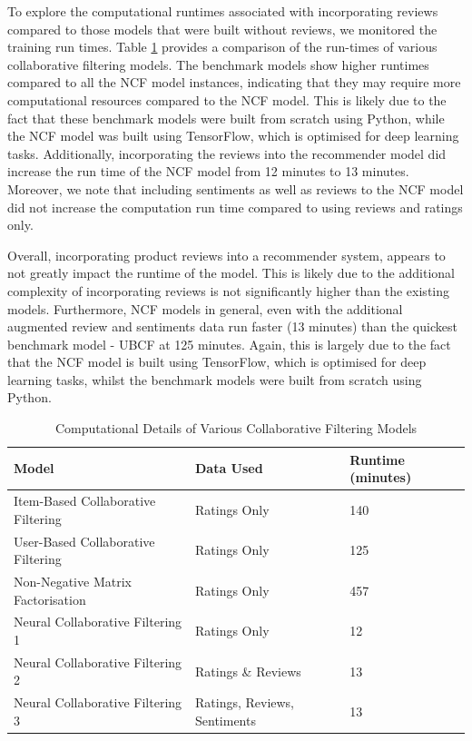 To explore the computational runtimes associated with incorporating reviews compared to those models that were built without reviews, we monitored the training run times. Table \ref{tab:computational-details} provides a comparison of the run-times of various collaborative filtering models. The benchmark models show higher runtimes compared to all the NCF model instances, indicating that they may require more computational resources compared to the NCF model. This is likely due to the fact that these benchmark models were built from scratch using Python, while the NCF model was built using TensorFlow, which is optimised for deep learning tasks. Additionally, incorporating the reviews into the recommender model did increase the run time of the NCF model from 12 minutes to 13 minutes. Moreover, we note that including sentiments as well as reviews to the NCF model did not increase the computation run time compared to using reviews and ratings only. 

Overall, incorporating product reviews into a recommender system, appears to not greatly impact the runtime of the model. This is likely due to the additional complexity of incorporating reviews is not significantly higher than the existing models. Furthermore, NCF models in general, even with the additional augmented review and sentiments data run faster (13 minutes) than the quickest benchmark model - UBCF at 125 minutes. Again, this is largely due to the fact that the NCF model is built using TensorFlow, which is optimised for deep learning tasks, whilst the benchmark models were built from scratch using Python. 

\begin{table}[htbp]
    \centering
    \begin{tabular}{|l|l|l|}
    \hline
    \textbf{Model} & \textbf{Data Used} & \textbf{Runtime (minutes)} \\
    \hline
    Item-Based Collaborative Filtering & Ratings Only & 140 \\
    User-Based Collaborative Filtering & Ratings Only & 125 \\
    Non-Negative Matrix Factorisation & Ratings Only & 457 \\
    Neural Collaborative Filtering 1 & Ratings Only & 12 \\
    Neural Collaborative Filtering 2 & Ratings \& Reviews &13 \\
    Neural Collaborative Filtering 3 & Ratings, Reviews, Sentiments & 13 \\
    \hline
    \end{tabular}
    \caption{Computational Details of Various Collaborative Filtering Models}
    \label{tab:computational-details}
\end{table}


